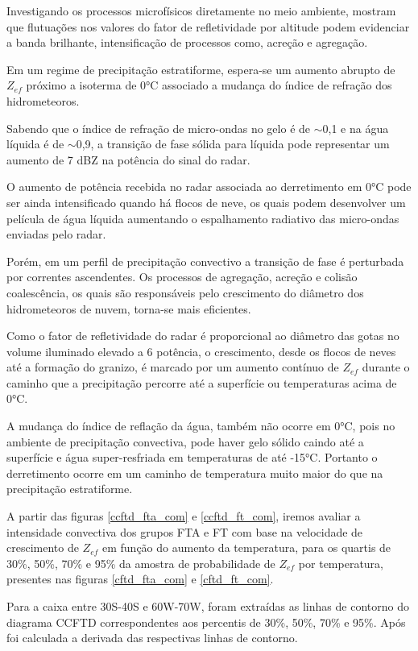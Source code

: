 Investigando os processos microfísicos diretamente no meio ambiente, \cite{Fabry1995} mostram que flutuações nos valores do fator de refletividade por altitude podem evidenciar a banda brilhante, intensificação de processos como, acreção e agregação.

Em um regime de precipitação estratiforme, espera-se um aumento abrupto de $Z_{ef}$ próximo a isoterma de 0°C associado a mudança do índice de refração dos hidrometeoros. 

Sabendo que o índice de refração de micro-ondas no gelo é de $\sim$0,1 e na água líquida é de $\sim$0,9, a transição de fase sólida para líquida pode representar um aumento de 7 dBZ na potência do sinal do radar. 

O aumento de potência recebida no radar associada ao derretimento em 0°C pode ser ainda intensificado quando há flocos de neve, os quais podem desenvolver um película de água líquida aumentando o espalhamento radiativo das micro-ondas enviadas pelo radar.

Porém, em um perfil de precipitação convectivo a transição de fase é perturbada por correntes ascendentes. Os processos de agregação, acreção e colisão coalescência, os quais são responsáveis pelo crescimento do diâmetro dos hidrometeoros de nuvem, torna-se mais eficientes. 

Como o fator de refletividade do radar é proporcional ao diâmetro das gotas no volume iluminado elevado a 6 potência, o crescimento, desde os flocos de neves até a formação do granizo, é marcado por um aumento contínuo de $Z_{ef}$ durante o caminho que a precipitação percorre até a superfície ou temperaturas acima de 0°C.

A mudança do índice de reflação da água, também não ocorre em 0°C, pois no ambiente de precipitação convectiva, pode haver gelo sólido caindo até a superfície e água super-resfriada em temperaturas de até -15°C. Portanto o derretimento ocorre em um caminho de temperatura muito maior do que na precipitação estratiforme.

A partir das figuras \ref{ccftd_fta_com} e \ref{ccftd_ft_com}, iremos avaliar a intensidade convectiva dos grupos FTA e FT com base na velocidade de crescimento de $Z_{ef}$ em função do aumento da temperatura, para os quartis de 30\%, 50\%, 70\% e 95\% da amostra de probabilidade de $Z_{ef}$ por temperatura, presentes nas figuras \ref{cftd_fta_com} e \ref{cftd_ft_com}.

Para a caixa entre 30S-40S e 60W-70W, foram extraídas as linhas de contorno do diagrama CCFTD correspondentes aos percentis de 30\%, 50\%, 70\% e 95\%. Após foi calculada a derivada das respectivas linhas de contorno.

